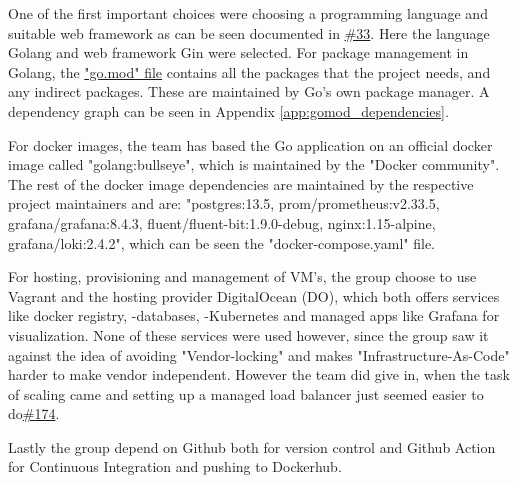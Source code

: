 
One of the first important choices were choosing a programming language and suitable web framework as can be seen documented in \href{https://github.com/DevelOpsITU/MiniTwit/issues/33}{\#33}. Here the language Golang and web framework Gin were selected. For package management in Golang, the \href{https://github.com/DevelOpsITU/MiniTwit/blob/main/go.mod}{"go.mod" file} contains all the packages that the project needs, and any indirect packages. These are maintained by Go's own package manager. A dependency graph can be seen in Appendix \ref{app:gomod_dependencies}.

For docker images, the team has based the Go application on an official docker image called "golang:bullseye", which is maintained by the "Docker community"\cite{docker_go_image}. The rest of the docker image dependencies are maintained by the respective project maintainers and are: "postgres:13.5, prom/prometheus:v2.33.5, grafana/grafana:8.4.3, fluent/fluent-bit:1.9.0-debug, nginx:1.15-alpine, grafana/loki:2.4.2", which can be seen the "docker-compose.yaml"\cite{github_minitwit_dockercompose} file.

For hosting, provisioning and management of VM's, the group choose to use Vagrant and the hosting provider DigitalOcean (DO), which both offers services like docker registry, -databases, -Kubernetes and managed apps like Grafana for visualization. None of these services were used however, since the group saw it against the idea of avoiding "Vendor-locking" and makes "Infrastructure-As-Code" harder to make vendor independent. However the team did give in, when the task of scaling came and setting up a managed load balancer just seemed easier to do\href{https://github.com/DevelOpsITU/MiniTwit/issues/174}{\#174}. 

Lastly the group depend on Github both for version control and Github Action for Continuous Integration and pushing to Dockerhub.


